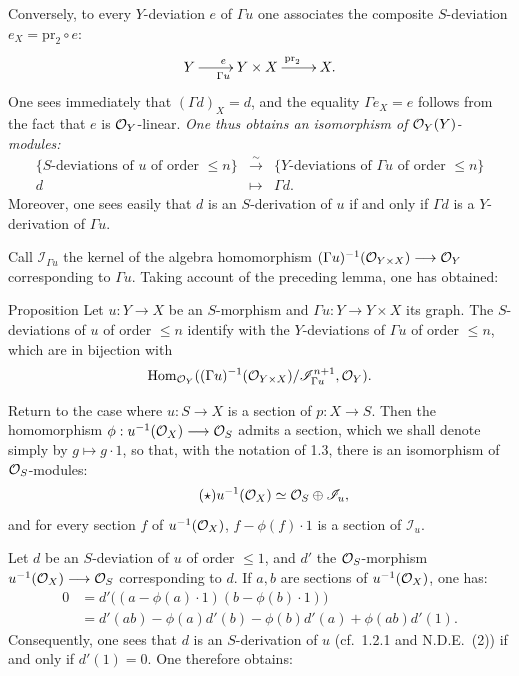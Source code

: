 Conversely, to every $Y$-deviation $e$ of $\Gamma u$ one associates the composite $S$-deviation $e_X=\mathrm{pr}_2\circ e$:
\[
\xymatrix{Y\ar[r]^{e}_{\Gamma u}&Y\times X\ar[r]^{\mathrm{pr}_2}&X.}
\]
One sees immediately that $(\Gamma d)_X=d$, and the equality $\Gamma e_X=e$ follows from the fact that $e$ is $\mathcal{O}_Y$-linear.
\emph{One thus obtains an isomorphism of $\mathcal{O}_Y(Y)$-modules:}
\[
\begin{array}{ccc}
\{\text{$S$-deviations of $u$ of order $\leq n$}\}&\xrightarrow{\sim}&\{\text{$Y$-deviations of $\Gamma u$ of order $\leq n$}\}\\
d&\longmapsto&\Gamma d.
\end{array}
\]
Moreover, one sees easily that $d$ is an $S$-derivation of $u$ if and only if $\Gamma d$ is a $Y$-derivation of $\Gamma u$.

Call $\mathscr I_{\Gamma u}$ the kernel of the algebra homomorphism $(\Gamma u)^{-1}(\mathcal{O}_{Y\times X})\longrightarrow\mathcal{O}_Y$ corresponding to $\Gamma u$. Taking account of the preceding lemma, one has obtained:

\begin{enonce}{Proposition}{}
Let $u:Y\to X$ be an $S$-morphism and $\Gamma u:Y\to Y\times X$ its graph. The $S$-deviations of $u$ of order $\leq n$ identify with the $Y$-deviations of $\Gamma u$ of order $\leq n$, which are in bijection with
\[
\operatorname{Hom}_{\mathcal{O}_Y}((\Gamma u)^{-1}(\mathcal{O}_{Y\times X})/\mathscr I_{\Gamma u}^{n+1},\mathcal{O}_Y).
\]
\end{enonce}

Return to the case where $u:S\to X$ is a section of $p:X\to S$. Then the homomorphism $\phi:u^{-1}(\mathcal{O}_X)\longrightarrow\mathcal{O}_S$ admits a section, which we shall denote simply by $g\mapsto g\cdot1$, so that, with the notation of 1.3, there is an isomorphism of $\mathcal{O}_S$-modules:
\begin{equation}\tag{$\star$}u^{-1}(\mathcal{O}_X)\simeq\mathcal{O}_S\oplus\mathscr I_u,\end{equation}
and for every section $f$ of $u^{-1}(\mathcal{O}_X)$, $f-\phi(f)\cdot1$ is a section of $\mathscr I_u$.

Let $d$ be an $S$-deviation of $u$ of order $\leq1$, and $d'$ the $\mathcal{O}_S$-morphism $u^{-1}(\mathcal{O}_X)\longrightarrow\mathcal{O}_S$ corresponding to $d$. If $a,b$ are sections of $u^{-1}(\mathcal{O}_X)$, one has:
\[
\begin{aligned}
0&=d'\bigl((a-\phi(a)\cdot1)(b-\phi(b)\cdot1)\bigr)\\
&=d'(ab)-\phi(a)d'(b)-\phi(b)d'(a)+\phi(ab)d'(1).
\end{aligned}
\]
Consequently, one sees that $d$ is an $S$-derivation of $u$ (cf.\ 1.2.1 and N.D.E.\ (2)) if and only if $d'(1)=0$. One therefore obtains:
